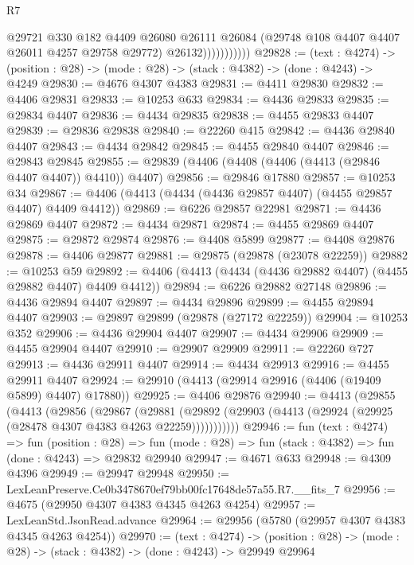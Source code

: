 \begin{lexlean}{R7}
\begin{coremodule}
                        @29721
                          @330
                          @182
                          @4409
                          @26080
                          @26111
                          @26084
                          (@29748 @108 @4407 @4407 @26011 @4257 @29758 @29772)
                          @26132)))))))))))
@29828 := (text : @4274) ->
  (position : @28) -> (mode : @28) -> (stack : @4382) -> (done : @4243) -> @4249
@29830 := @4676 @4307 @4383
@29831 := @4411 @29830
@29832 := @4406 @29831
@29833 := @10253 @633
@29834 := @4436 @29833
@29835 := @29834 @4407
@29836 := @4434 @29835
@29838 := @4455 @29833 @4407
@29839 := @29836 @29838
@29840 := @22260 @415
@29842 := @4436 @29840 @4407
@29843 := @4434 @29842
@29845 := @4455 @29840 @4407
@29846 := @29843 @29845
@29855 := @29839 (@4406 (@4408 (@4406 (@4413 (@29846 @4407 @4407)) @4410)) @4407)
@29856 := @29846 @17880
@29857 := @10253 @34
@29867 := @4406 (@4413 (@4434 (@4436 @29857 @4407) (@4455 @29857 @4407) @4409 @4412))
@29869 := @6226 @29857 @22981
@29871 := @4436 @29869 @4407
@29872 := @4434 @29871
@29874 := @4455 @29869 @4407
@29875 := @29872 @29874
@29876 := @4408 @5899
@29877 := @4408 @29876
@29878 := @4406 @29877
@29881 := @29875 (@29878 (@23078 @22259))
@29882 := @10253 @59
@29892 := @4406 (@4413 (@4434 (@4436 @29882 @4407) (@4455 @29882 @4407) @4409 @4412))
@29894 := @6226 @29882 @27148
@29896 := @4436 @29894 @4407
@29897 := @4434 @29896
@29899 := @4455 @29894 @4407
@29903 := @29897 @29899 (@29878 (@27172 @22259))
@29904 := @10253 @352
@29906 := @4436 @29904 @4407
@29907 := @4434 @29906
@29909 := @4455 @29904 @4407
@29910 := @29907 @29909
@29911 := @22260 @727
@29913 := @4436 @29911 @4407
@29914 := @4434 @29913
@29916 := @4455 @29911 @4407
@29924 := @29910 (@4413 (@29914 @29916 (@4406 (@19409 @5899) @4407) @17880))
@29925 := @4406 @29876
@29940 := @4413
    (@29855
      (@4413
        (@29856
          (@29867
            (@29881
              (@29892 (@29903 (@4413 (@29924 (@29925 (@28478 @4307 @4383 @4263 @22259)))))))))))
@29946 := fun (text : @4274) =>
  fun (position : @28) =>
  fun (mode : @28) => fun (stack : @4382) => fun (done : @4243) => @29832 @29940
@29947 := @4671 @633
@29948 := @4309 @4396
@29949 := @29947 @29948
@29950 := LexLeanPreserve.Ce0b3478670ef79bb00fc17648de57a55.R7.__fits_7
@29956 := @4675 (@29950 @4307 @4383 @4345 @4263 @4254)
@29957 := LexLeanStd.JsonRead.advance
@29964 := @29956 (@5780 (@29957 @4307 @4383 @4345 @4263 @4254))
@29970 := (text : @4274) ->
  (position : @28) -> (mode : @28) -> (stack : @4382) -> (done : @4243) -> @29949 @29964

\end{coremodule}
\end{lexlean}
